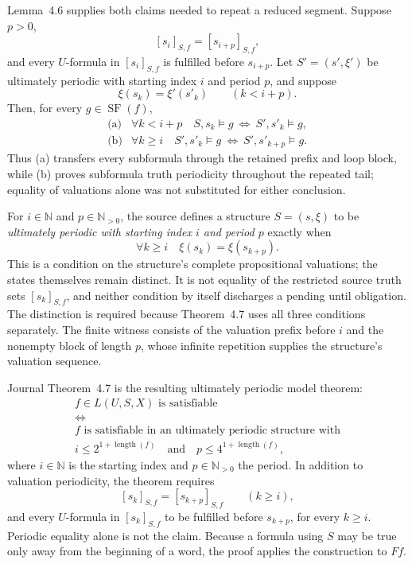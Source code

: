 Lemma~4.6 supplies both claims needed to repeat a reduced segment.  Suppose
\(p>0\),
\[
 [s_i]_{S,f}=[s_{i+p}]_{S,f},
\]
and every \(U\)-formula in \([s_i]_{S,f}\) is fulfilled before
\(s_{i+p}\).  Let \(S'=(s',\xi')\) be ultimately periodic with starting
index \(i\) and period \(p\), and suppose
\[
 \xi(s_k)=\xi'(s'_k)\qquad(k<i+p).
\]
Then, for every \(g\in\operatorname{SF}(f)\),
\[
\begin{array}{ll}
 \text{(a)}&
 \forall k<i+p\quad
 S,s_k\models g\ \Longleftrightarrow\ S',s'_k\models g,\\[2pt]
 \text{(b)}&
 \forall k\ge i\quad
 S',s'_k\models g\ \Longleftrightarrow\ S',s'_{k+p}\models g.
\end{array}
\]
Thus (a) transfers every subformula through the retained prefix and loop
block, while (b) proves subformula truth periodicity throughout the repeated
tail; equality of valuations alone was not substituted for either conclusion.

For \(i\in\mathbb N\) and \(p\in\mathbb N_{>0}\), the source defines a
structure \(S=(s,\xi)\) to be \emph{ultimately periodic with starting index
\(i\) and period \(p\)} exactly when
\[
 \forall k\ge i\quad \xi(s_k)=\xi(s_{k+p}).
\]
This is a condition on the structure's complete propositional valuations; the
states themselves remain distinct.  It is not equality of the restricted
source truth sets \([s_k]_{S,f}\), and neither condition by itself discharges a
pending until obligation.  The distinction is required because
Theorem~4.7 uses all three conditions separately.  The finite witness consists
of the valuation prefix before \(i\) and the nonempty block of length \(p\),
whose infinite repetition supplies the structure's valuation sequence.

Journal Theorem~4.7 is the resulting ultimately periodic model theorem:
\[
\begin{gathered}
 f\in L(U,S,X)\text{ is satisfiable}\\
 \Longleftrightarrow\\
 f\text{ is satisfiable in an ultimately periodic structure with}\\
 i\le 2^{1+\operatorname{length}(f)}
 \quad\text{and}\quad
 p\le 4^{1+\operatorname{length}(f)},
\end{gathered}
\]
where \(i\in\mathbb N\) is the starting index and
\(p\in\mathbb N_{>0}\) the period.  In addition to valuation periodicity, the
theorem requires
\[
 [s_k]_{S,f}=[s_{k+p}]_{S,f}\qquad(k\ge i),
\]
and every \(U\)-formula in \([s_k]_{S,f}\) to be fulfilled
before \(s_{k+p}\), for every \(k\ge i\).  Periodic equality alone is not the
claim.  Because a formula using \(S\) may be true only away from the beginning
of a word, the proof applies the construction to \(Ff\).

